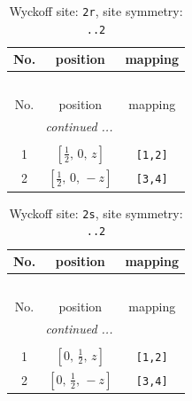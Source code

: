 \documentclass[fleqn,8pt]{jsarticle}
\begin{document}
\renewcommand{\arraystretch}{1.2}
\begin{longtable}{ccc}
\caption{Wyckoff site: {\tt 2r}, site symmetry: {\tt ..2}}
 \\
 \hline \hline
No. & position & mapping \\ \hline \endfirsthead

\multicolumn{2}{l}{\tablename\ \thetable{}} \\
 \hline \hline
No. & position & mapping \\ \hline \endhead

 \hline \hline
\multicolumn{2}{r}{\footnotesize\it continued ...} \\ \endfoot

 \hline \hline
\multicolumn{2}{r}{} \\ \endlastfoot

1 & $\left[ \frac{1}{2},\, 0,\, z \right]$ & {\tt [1,2]} \\ \hline
2 & $\left[ \frac{1}{2},\, 0,\, - z \right]$ & {\tt [3,4]} \\
\end{longtable}
\renewcommand{\arraystretch}{1.2}
\begin{longtable}{ccc}
\caption{Wyckoff site: {\tt 2s}, site symmetry: {\tt ..2}}
 \\
 \hline \hline
No. & position & mapping \\ \hline \endfirsthead

\multicolumn{2}{l}{\tablename\ \thetable{}} \\
 \hline \hline
No. & position & mapping \\ \hline \endhead

 \hline \hline
\multicolumn{2}{r}{\footnotesize\it continued ...} \\ \endfoot

 \hline \hline
\multicolumn{2}{r}{} \\ \endlastfoot

1 & $\left[ 0,\, \frac{1}{2},\, z \right]$ & {\tt [1,2]} \\ \hline
2 & $\left[ 0,\, \frac{1}{2},\, - z \right]$ & {\tt [3,4]} \\
\end{longtable}
\renewcommand{\arraystretch}{1.2}
\end{document}
